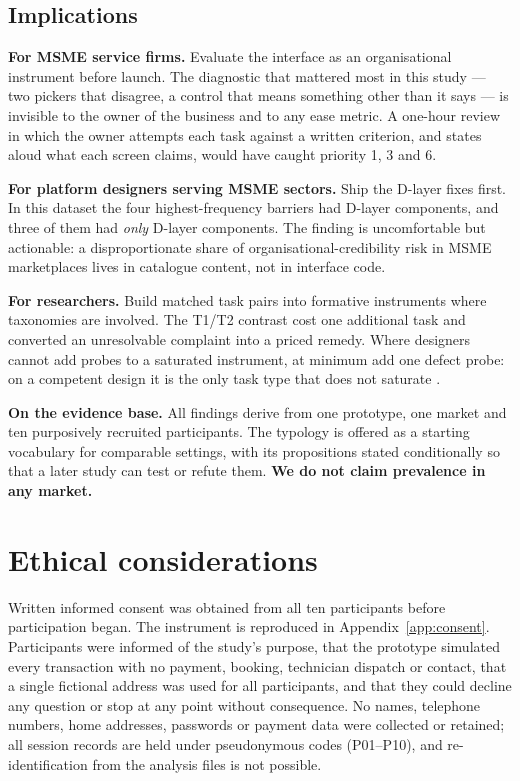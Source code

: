 \documentclass[]{interact}
\theoremstyle{plain}
\begin{document}
\subsection{Implications}

\textbf{For MSME service firms.} Evaluate the interface as an organisational instrument before launch.
The diagnostic that mattered most in this study --- two pickers that disagree, a control that means
something other than it says --- is invisible to the owner of the business and to any ease metric. A
one-hour review in which the owner attempts each task against a written criterion, and states aloud
what each screen claims, would have caught priority 1, 3 and 6.

\textbf{For platform designers serving MSME sectors.} Ship the D-layer fixes first. In this dataset the
four highest-frequency barriers had D-layer components, and three of them had \emph{only} D-layer
components. The finding is uncomfortable but actionable: a disproportionate share of
organisational-credibility risk in MSME marketplaces lives in catalogue content, not in interface code.

\textbf{For researchers.} Build matched task pairs into formative instruments where taxonomies are
involved. The T1/T2 contrast cost one additional task and converted an unresolvable complaint into a
priced remedy. Where designers cannot add probes to a saturated instrument, at minimum add one defect
probe: on a competent design it is the only task type that does not saturate
\citep{braniwati2026dispersion}.

\textbf{On the evidence base.} All findings derive from one prototype, one market and ten purposively
recruited participants. The typology is offered as a starting vocabulary for comparable settings, with
its propositions stated conditionally so that a later study can test or refute them. \textbf{We do not
claim prevalence in any market.}

\section{Ethical considerations}
\label{sec:ethics}

Written informed consent was obtained from all ten participants before participation began. The
instrument is reproduced in Appendix~\ref{app:consent}. Participants were informed of the study's
purpose, that the prototype simulated every transaction with no payment, booking, technician dispatch
or contact, that a single fictional address was used for all participants, and that they could decline
any question or stop at any point without consequence. No names, telephone numbers, home addresses,
passwords or payment data were collected or retained; all session records are held under pseudonymous
codes (P01--P10), and re-identification from the analysis files is not possible.
\end{document}
